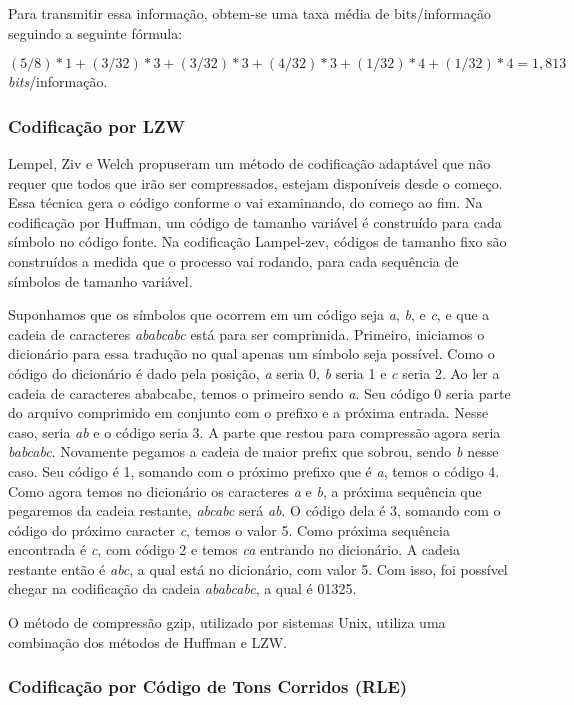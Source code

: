 Para transmitir essa informação, obtem-se uma taxa média de bits/informação seguindo a seguinte fórmula:

\[ (5/8)*1 + (3/32)*3 + (3/32)*3 + (4/32)*3 + (1/32)*4 + (1/32)*4 = 1,813 \] {\em bits}/informação.

\subsubsection{Codificação por LZW}
\label{sss.lzw}

Lempel, Ziv e Welch propuseram um método de codificação adaptável que não requer que todos que irão ser compressados, estejam disponíveis desde o começo. Essa técnica gera o código conforme o vai examinando, do começo ao fim. Na codificação por Huffman, um código de tamanho variável é construído para cada símbolo no código fonte. Na codificação Lampel-zev, códigos de tamanho fixo são construídos a medida que o processo vai rodando, para cada sequência de símbolos de tamanho variável.

Suponhamos que os símbolos que ocorrem em um código seja {\em a}, {\em b}, e {\em c}, e que a cadeia de caracteres {\em ababcabc} está para ser comprimida. Primeiro, iniciamos o dicionário para essa tradução no qual apenas um símbolo seja possível. Como o código do dicionário é dado pela posição, {\em a} seria 0, {\em b} seria 1 e {\em c} seria 2. Ao ler a cadeia de caracteres ababcabc, temos o primeiro sendo {\em a}. Seu código 0 seria parte do arquivo comprimido em conjunto com o prefixo e a próxima entrada. Nesse caso, seria {\em ab} e o código seria 3. A parte que restou para compressão agora seria {\em babcabc}. Novamente pegamos a cadeia de maior prefix que sobrou, sendo {\em b} nesse caso. Seu código é 1, somando com o próximo prefixo que é {\em a}, temos o código 4. Como agora temos no dicionário os caracteres {\em a} e {\em b}, a próxima sequência que pegaremos da cadeia restante, {\em abcabc} será {\em ab}. O código dela é 3, somando com o código do próximo caracter {\em c}, temos o valor 5. Como próxima sequência encontrada é {\em c}, com código 2 e temos {\em ca} entrando no dicionário. A cadeia restante então é {\em abc}, a qual está no dicionário, com valor 5. Com isso, foi possível chegar na codificação da cadeia {\em ababcabc}, a qual é 01325.

O método de compressão gzip, utilizado por sistemas Unix, utiliza uma combinação dos métodos de Huffman e LZW.

\subsubsection{Codificação por Código de Tons Corridos (RLE)}
\label{sss.runlength}


